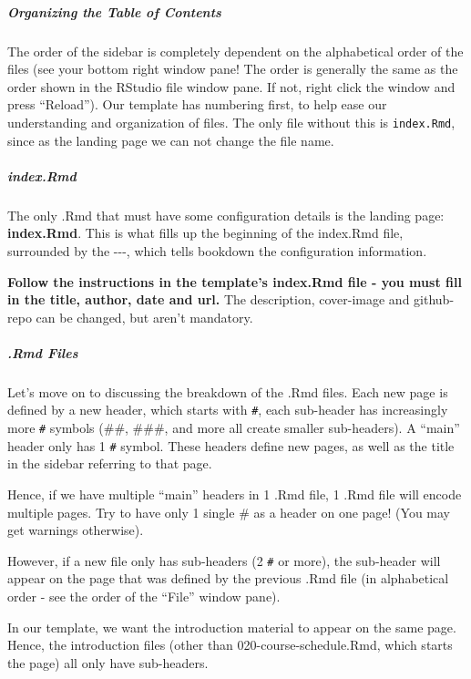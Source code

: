 \documentclass[
]{book}
\theoremstyle{definition}
\theoremstyle{definition}
\theoremstyle{definition}
\theoremstyle{definition}
\theoremstyle{remark}
\begin{document}
\subparagraph*{\texorpdfstring{ Organizing the Table of Contents }{ Organizing the Table of Contents }}\label{organizing-the-table-of-contents}

The order of the sidebar is completely dependent on the alphabetical order of the files (see your bottom right window pane! The order is generally the same as the order shown in the RStudio file window pane. If not, right click the window and press ``Reload''). Our template has numbering first, to help ease our understanding and organization of files. The only file without this is \texttt{index.Rmd}, since as the landing page we can not change the file name.

\subparagraph*{\texorpdfstring{ index.Rmd }{ index.Rmd }}\label{index.rmd}

The only .Rmd that must have some configuration details is the landing page: \textbf{index.Rmd}. This is what fills up the beginning of the index.Rmd file, surrounded by the -\/-\/-, which tells bookdown the configuration information.

\textbf{Follow the instructions in the template's index.Rmd file - you must fill in the title, author, date and url.} The description, cover-image and github-repo can be changed, but aren't mandatory.

\subparagraph*{\texorpdfstring{ .Rmd Files }{ .Rmd Files }}\label{rmd-files}

Let's move on to discussing the breakdown of the .Rmd files. Each new page is defined by a new header, which starts with \texttt{\#}, each sub-header has increasingly more \texttt{\#} symbols (\#\#, \#\#\#, and more all create smaller sub-headers). A ``main'' header only has 1 \texttt{\#} symbol. These headers define new pages, as well as the title in the sidebar referring to that page.

Hence, if we have multiple ``main'' headers in 1 .Rmd file, 1 .Rmd file will encode multiple pages. Try to have only 1 single \# as a header on one page! (You may get warnings otherwise).

However, if a new file only has sub-headers (2 \texttt{\#} or more), the sub-header will appear on the page that was defined by the previous .Rmd file (in alphabetical order - see the order of the ``File'' window pane).

In our template, we want the introduction material to appear on the same page. Hence, the introduction files (other than 020-course-schedule.Rmd, which starts the page) all only have sub-headers.
\end{document}
